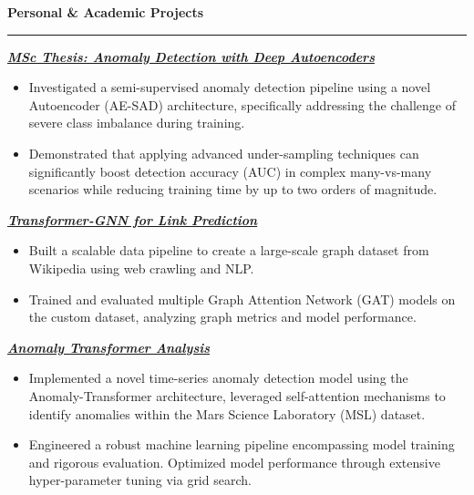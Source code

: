 \documentclass[9pt, a4paper]{article}
\newcommand{\cvsection}[1]{%
	\vspace{2pt}\par
	{\Large\bfseries\color{sectionblue}#1}\par
	\vspace{2pt}\hrule\vspace{6pt}
}
\newcommand{\cvproject}[1]{%
	\par {\large{\bfseries{\textit{#1}}}} \par \vspace{4pt}
}
\begin{document}
\begin{minipage}[t]{0.65\linewidth}
		\vspace{10pt}\par
		\cvsection{Personal \& Academic Projects}
		
		\cvproject{\href{https://github.com/bGuzzo/msc-ai-ml-thesis-anomaly-detection}{MSc Thesis: Anomaly Detection with Deep Autoencoders}}
		\begin{itemize}[leftmargin=*, nosep]
			\item \footnotesize Investigated a semi-supervised anomaly detection pipeline using a novel Autoencoder (AE-SAD) architecture, specifically addressing the challenge of severe class imbalance during training.
			
			\vspace{2pt}
			\item \footnotesize Demonstrated that applying advanced under-sampling techniques can significantly boost detection accuracy (AUC) in complex many-vs-many scenarios while reducing training time by up to two orders of magnitude.
		\end{itemize}
		
		\vspace{6pt}
		\cvproject{\href{https://github.com/bGuzzo/transformer-gnn-link-prediction}{Transformer-GNN for Link Prediction}}
		\begin{itemize}[leftmargin=*, nosep]
			\item \footnotesize Built a scalable data pipeline to create a large-scale graph dataset from Wikipedia using web crawling and NLP.
			
			\vspace{2pt}
			\item \footnotesize Trained and evaluated multiple Graph Attention Network (GAT) models on the custom dataset, analyzing graph metrics and model performance.
		\end{itemize}
		
		\vspace{6pt}
		\cvproject{\href{https://github.com/bGuzzo/Anomaly-Transformer-Analysis}{Anomaly Transformer Analysis}}
		\begin{itemize}[leftmargin=*, nosep]
			\item \footnotesize Implemented a novel time-series anomaly detection model using the Anomaly-Transformer architecture, leveraged self-attention mechanisms to identify anomalies within the Mars Science Laboratory (MSL) dataset.
			
			\vspace{2pt}
			\item \footnotesize Engineered a robust machine learning pipeline encompassing model training and rigorous evaluation. Optimized model performance through extensive hyper-parameter tuning via grid search.
		\end{itemize}
			

\end{minipage}
\end{document}
